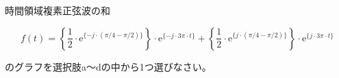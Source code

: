 時間領域複素正弦波の和

\[
f(t) =
\left \{ \frac{1}{2} \cdot \textrm{e}^{\{-j \cdot (\pi/4 - \pi/2) \}} \right \} \cdot \textrm{e}^{\{-j \cdot 3\pi \cdot t \}} +  
\left \{ \frac{1}{2} \cdot \textrm{e}^{\{ j \cdot (\pi/4 - \pi/2) \}} \right \} \cdot \textrm{e}^{\{j \cdot 3\pi \cdot t \}}
\]

\bigskip
\noindent  のグラフを選択肢a〜dの中から1つ選びなさい。
